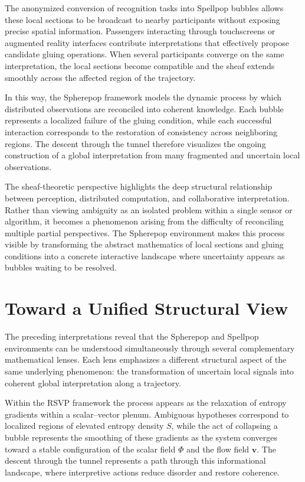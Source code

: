 \documentclass[11pt]{article}
\begin{document}
The anonymized conversion of recognition tasks into Spellpop bubbles allows these local sections to be broadcast to nearby participants without exposing precise spatial information. Passengers interacting through touchscreens or augmented reality interfaces contribute interpretations that effectively propose candidate gluing operations. When several participants converge on the same interpretation, the local sections become compatible and the sheaf extends smoothly across the affected region of the trajectory.

In this way, the Spherepop framework models the dynamic process by which distributed observations are reconciled into coherent knowledge. Each bubble represents a localized failure of the gluing condition, while each successful interaction corresponds to the restoration of consistency across neighboring regions. The descent through the tunnel therefore visualizes the ongoing construction of a global interpretation from many fragmented and uncertain local observations.

The sheaf-theoretic perspective highlights the deep structural relationship between perception, distributed computation, and collaborative interpretation. Rather than viewing ambiguity as an isolated problem within a single sensor or algorithm, it becomes a phenomenon arising from the difficulty of reconciling multiple partial perspectives. The Spherepop environment makes this process visible by transforming the abstract mathematics of local sections and gluing conditions into a concrete interactive landscape where uncertainty appears as bubbles waiting to be resolved.

\section{Toward a Unified Structural View}

The preceding interpretations reveal that the Spherepop and Spellpop environments can be understood simultaneously through several complementary mathematical lenses. Each lens emphasizes a different structural aspect of the same underlying phenomenon: the transformation of uncertain local signals into coherent global interpretation along a trajectory.

Within the RSVP framework the process appears as the relaxation of entropy gradients within a scalar--vector plenum. Ambiguous hypotheses correspond to localized regions of elevated entropy density $S$, while the act of collapsing a bubble represents the smoothing of these gradients as the system converges toward a stable configuration of the scalar field $\Phi$ and the flow field $\mathbf{v}$. The descent through the tunnel represents a path through this informational landscape, where interpretive actions reduce disorder and restore coherence.
\end{document}
